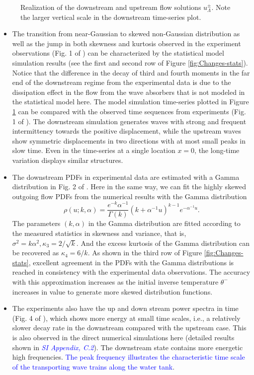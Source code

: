 \documentclass[9pt,twocolumn,twoside,lineno]{pnas-new}
\begin{document}
\begin{figure}[h]
\vspace{-1em}
\caption{Realization of the downstream and upstream flow solutions $u_{\Lambda}^{\pm}$. Note the larger vertical scale in the downstream time-series plot.\label{fig:Realization}}
\end{figure}
\begin{itemize}
\item The transition from near-Gaussian to skewed non-Gaussian distribution
as well as the jump in both skewness and kurtosis observed in the
experiment observations (Fig. 1 of  \cite{bolles2018anomalous}) can
be characterized by the statistical model simulation results (see
the first and second row of Figure \ref{fig:Changes-stats}). Notice
that the difference in the decay of third and fourth moments in the far
end of the downstream regime from the experimental data is due to the
dissipation effect in the flow from the wave absorbers that is not modeled in the statistical
model here. The model simulation time-series plotted in Figure \ref{fig:Realization}
can be compared with the observed time sequences from experiments
(Fig. 1 of \cite{bolles2018anomalous}). The downstream simulation generates
waves with strong and frequent intermittency towards the positive
displacement, while the upstream waves show symmetric displacements
in two directions with at most small peaks in slow time. Even in the
time-series at a single location $x=0$, the long-time variation displays similar
structures. 
\item The downstream PDFs in experimental data are estimated with a Gamma
distribution in Fig. 2 of \cite{bolles2018anomalous}. Here in the same
way, we can fit the highly skewed outgoing flow PDFs from the numerical
results with the Gamma distribution
\[
\rho\left(u;k,\alpha\right)=\frac{e^{-k}\alpha^{-1}}{\Gamma\left(k\right)}\left(k+\alpha^{-1}u\right)^{k-1}e^{-\alpha^{-1}u}.
\]
The parameters $\left(k,\alpha\right)$ in the Gamma distribution
are fitted according to the measured statistics in skewness and variance,
that is, $\sigma^{2}=k\alpha^{2},\kappa_{3}=2/\sqrt{k}$. And the excess
kurtosis of the Gamma distribution can be recovered as $\kappa_{4}=6/k$.
As shown in the third row of Figure \ref{fig:Changes-stats}, excellent
agreement in the PDFs with the Gamma distributions
is reached in consistency with the experimental data observations.
The accuracy with this approximation increases as the initial inverse
temperature $\theta^{-}$ increases in value to generate more skewed
distribution functions.
\item The experiments also have the up and down stream power spectra in
time (Fig. 4 of \cite{bolles2018anomalous}), which shows more energy
at small time scales, i.e., a relatively slower decay rate in the
downstream compared with the upstream case. This is also observed
in the direct numerical simulations here (detailed results shown
in \textcolor{blue}{\emph{SI Appendix, C.2}}). The downstream state contains
more energetic high frequencies.
\textcolor{blue}{The peak frequency illustrates the characteristic time scale of the transporting
wave trains along the water tank}.


\end{itemize}
\end{document}
